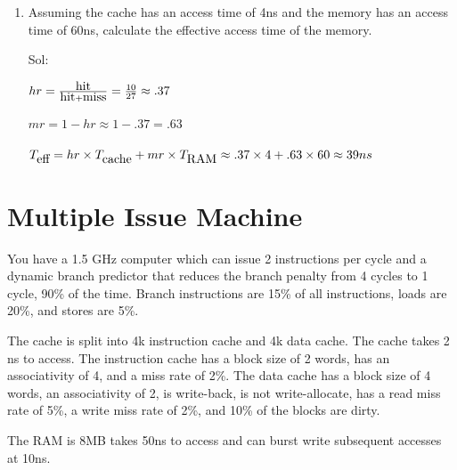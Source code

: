 \begin{enumerate}
\item Assuming the cache has an access time of 4ns and the memory has an access time of 60ns, calculate the effective access time of the memory.

    {\color{ans}
    Sol:

    $hr=\frac{\hbox{hit}}{\hbox{hit}+\hbox{miss}}=\frac{10}{27}\approx .37$

    $mr=1-hr\approx 1-.37=.63$

    $T_{\hbox{eff}}=hr\times T_{\hbox{cache}}+mr\times T_{\hbox{RAM}}\approx .37\times 4 + .63\times 60 \approx 39 ns$
    }

\end{enumerate}

\section{Multiple Issue Machine}

You have a 1.5 GHz computer which can issue 2 instructions per cycle and a dynamic branch predictor that reduces the branch penalty from 4 cycles to 1 cycle, 90\% of the time.  Branch instructions are 15\% of all instructions, loads are 20\%, and stores are 5\%.

The cache is split into 4k instruction cache and 4k data cache.  The cache takes 2 ns to access.  The instruction cache has a block size of 2 words, has an associativity of 4, and a miss rate of 2\%.  The data cache has a block size of 4 words, an associativity of 2, is write-back, is not write-allocate, has a read miss rate of 5\%, a write miss rate of 2\%, and 10\% of the blocks are dirty.

The RAM is 8MB takes 50ns to access and can burst write subsequent accesses at 10ns.

